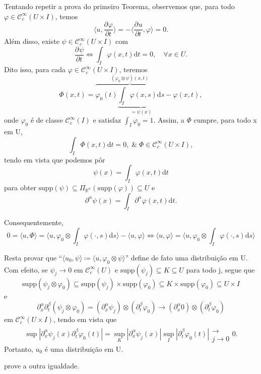 \documentclass[../distribution_theory_notes.tex]{subfiles}
\begin{document}
   \begin{proof*}
     Tentando repetir a prova do primeiro Teorema, observemos que, para todo \(\varphi \in \mathcal{C}_{c}^{\infty}(U\times I)\), temos 
       \[
         \biggl\langle u, \frac{\partial^{}\varphi }{\partial t^{}} \biggr\rangle = - \biggl\langle \frac{\partial^{}u}{\partial t^{}}, \varphi \biggr\rangle = 0.
       \]
       Além disso, existe \(\psi \in \mathcal{C}_{c}^{\infty}(U\times I)\) com 
         \[
           \frac{\partial^{}\psi }{\partial t^{}} \Longleftrightarrow \int_{I}^{}\varphi (x, t) \mathrm{d}t =0, \quad \forall x\in U.
         \]
         Dito isso, para cada \(\varphi \in \mathcal{C}_{c}^{\infty}(U\times I)\), teremos 
           \[
             \Phi (x, t)= \overbrace{\varphi_{0}(t) \underbrace{\int_{I}^{}\varphi (x, s) \mathrm{d}s}_{=\psi (x)}}^{(\varphi_{0}\otimes \psi )(x, t)} - \varphi (x, t),
           \]
           onde \(\varphi_{0}\) é de classe \(\mathcal{C}_{c}^{\infty}(I)\) e satisfaz \(\int_{I}^{}\varphi_{0} =1\). Assim, a \(\Phi \) cumpre, para todo x em U, 
             \[
               \int_{I}^{}\Phi (x, t) \mathrm{d}t = 0, \;\&\; \Phi \in \mathcal{C}_{c}^{\infty}(U\times I),
             \]
             tendo em vista que podemos pôr 
               \[
                 \psi (x)=\int_{I}^{}\varphi (x, t) \mathrm{d}t
               \]
               para obter \(\mathrm{supp}(\psi )\subseteq \Pi_{\mathbb{R}^{n}}(\mathrm{supp}(\varphi ))\subseteq U\) e 
                 \[
                 \partial^{\alpha }\psi (x) = \int_{I}^{}\partial^{\alpha }\varphi (x, t) \mathrm{d}t.
                 \]

             Consequentemente, 
               \[
                 0=\langle u, \Phi  \rangle = \biggl\langle u, \varphi_{0}\otimes \int_{I}^{}\varphi (\cdot , s) \mathrm{d}s \biggr\rangle - \langle u, \varphi  \rangle \Longleftrightarrow \langle u, \varphi  \rangle = \biggl\langle u, \varphi_{0} \otimes \int_{I}^{}\varphi (\cdot , s) \mathrm{d}s \biggr\rangle
               \]

               Resta provar que ``\(\langle u_{0}, \psi  \rangle\coloneqq \langle u, \varphi_{0}\otimes \psi  \rangle\)'' define de fato uma distribuição em U. Com efeito, se \(\psi_{j}\to 0\) em \(\mathcal{C}_{c}^{\infty}(U)\) e \(\mathrm{supp}(\psi_{j})\subseteq K\subseteq U\) para todo j, segue que 
                 \[
                   \mathrm{supp}(\psi_{j}\otimes \varphi_{0})\subseteq \mathrm{supp}(\psi_{j}) \times \mathrm{supp}(\varphi_{0})\subseteq K\times \mathrm{supp}(\varphi_{0}) \subseteq U\times I
                 \]
    e 
      \[
        \partial_{x}^{\alpha }\partial_{t}^{\beta }(\psi_{j}\otimes \varphi_{0})=(\partial_{x}^{\alpha }\psi_{j})\otimes (\partial_{t}^{\beta }\varphi_{0})\to (\partial_{x}^{\alpha }0) \otimes (\partial_{t}^{\beta }\varphi_{0})
      \]
      em  \(\mathcal{C}_{c}^{\infty}(U\times I)\), tendo em vista que 
        \[
          \sup_{}| \partial_{x}^{\alpha }\psi_{j}(x)\partial_{t}^{\beta }\varphi_{0}(t) | = \sup_{K}| \partial_x^{\alpha } \psi_j(x)| \sup_{I}| \partial_{t}^{\beta }\varphi_{0}(t) |\substack{ \\ \longrightarrow \\ j\to0}0.
        \]
        Portanto, \(u_{0}\) é uma distribuição em U. \qedsymbol
   \end{proof*}
  \begin{exr}
    prove a outra igualdade.
  \end{exr}
\end{document}
